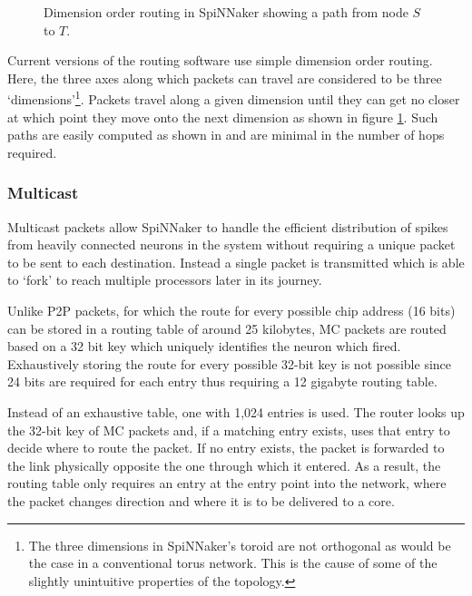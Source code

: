 				\begin{figure}
					\center
					
					\caption[Dimension order routing in SpiNNaker.]{Dimension order routing
					in SpiNNaker showing a path from node $S$ to $T$.}
					\label{fig:dimension-order-routing}
				\end{figure}
				
				Current versions of the routing software use simple dimension order
				routing. Here, the three axes along which packets can travel are
				considered to be three `dimensions'\footnote{The three dimensions in
				SpiNNaker's toroid are not orthogonal as would be the case in a
				conventional torus network. This is the cause of some of the slightly
				unintuitive properties of the topology.}. Packets travel along a given
				dimension until they can get no closer at which point they move onto the
				next dimension as shown in figure \ref{fig:dimension-order-routing}.
				Such paths are easily computed as shown in \cite{nocetti02} and are
				minimal in the number of hops required.
			
			\subsubsection{Multicast}
				
				Multicast packets allow SpiNNaker to handle the efficient distribution
				of spikes from heavily connected neurons in the system without requiring
				a unique packet to be sent to each destination. Instead a single packet
				is transmitted which is able to `fork' to reach multiple processors
				later in its journey.
				
				Unlike P2P packets, for which the route for every possible chip address
				(16 bits) can be stored in a routing table of around 25 kilobytes, MC
				packets are routed based on a 32 bit key which uniquely identifies the
				neuron which fired.  Exhaustively storing the route for every possible
				32-bit key is not possible since 24 bits are required for each entry
				thus requiring a 12 gigabyte routing table.
				
				Instead of an exhaustive table, one with 1,024 entries is used. The
				router looks up the 32-bit key of MC packets and, if a matching entry
				exists, uses that entry to decide where to route the packet. If no entry
				exists, the packet is forwarded to the link physically opposite the one
				through which it entered. As a result, the routing table only requires
				an entry at the entry point into the network, where the packet changes
				direction and where it is to be delivered to a core.
				

